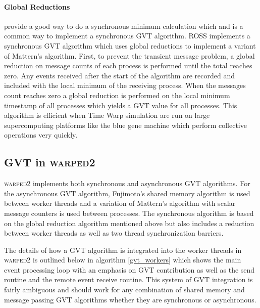 \documentclass[11pt]{book}
\begin{document}
\paragraph{Global Reductions} provide a good way to do a synchronous minimum calculation which and
is a common way to implement a synchronous GVT algorithm.  ROSS implements a synchronous GVT
algorithm which uses global reductions to implement a variant of Mattern's algorithm\cite{holder-08}.
First, to prevent the transient message problem, a global reduction on
message counts of each process is performed until the total reaches zero.  Any events received after
the start of the algorithm are recorded and included with the local minimum of the receiving
process.  When the messages count reaches zero a global reduction is performed on the local minimum
timestamp of all processes which yields a GVT value for all processes.  This algorithm is efficient
when Time Warp simulation are run on large supercomputing platforms like the blue gene machine which
perform collective operations very quickly.

\subsection{GVT in \textsc{warped2}}

\textsc{warped2} implements both synchronous and asynchronous GVT algorithms.  For the asynchronous
GVT algorithm, Fujimoto's shared memory algorithm is used between worker threads and a variation of
Mattern's algorithm with scalar message counters is used between processes.  The synchronous
algorithm is based on the global reduction algorithm mentioned above but also includes a reduction
between worker threads as well as two thread synchronization barriers.

The details of how a GVT algorithm is integrated into the worker threads in \textsc{warped2} is
outlined below in algorithm \ref{gvt_workers} which shows the main event processing loop with an
emphasis on GVT contribution as well as the send routine and the remote event receive routine.  This
system of GVT integration is fairly ambiguous and should work for any combination of shared memory
and message passing GVT algorithms whether they are synchronous or asynchronous.
\end{document}
